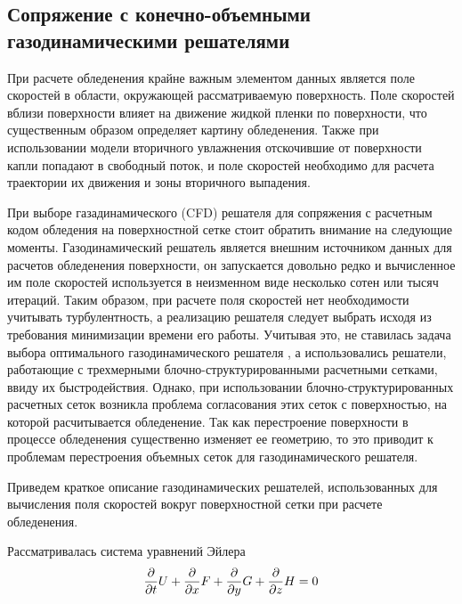 \subsection{Сопряжение с конечно-объемными \\ газодинамическими решателями}\label{sec:text_1_gas}

При расчете обледенения крайне важным элементом данных является поле скоростей в области, окружающей рассматриваемую поверхность.
Поле скоростей вблизи поверхности влияет на движение жидкой пленки по поверхности, что существенным образом определяет картину обледенения.
Также при использовании модели вторичного увлажнения отскочившие от поверхности капли попадают в свободный поток, и поле скоростей необходимо для расчета траектории их движения и зоны вторичного выпадения.

При выборе газадинамического (CFD\label{abbr:cfd}) решателя для сопряжения с расчетным кодом обледения на поверхностной сетке стоит обратить внимание на следующие моменты.
Газодинамический решатель является внешним источником данных для расчетов обледенения поверхности, он запускается довольно редко и вычисленное им поле скоростей используется в неизменном виде несколько сотен или тысяч итераций.
Таким образом, при расчете поля скоростей нет необходимости учитывать турбулентность, а реализацию решателя следует выбрать исходя из требования минимизации времени его работы.
Учитывая это, не ставилась задача выбора оптимального газодинамического решателя \cite{Blazek2015CFD}, а использовались решатели, работающие с трехмерными блочно-структурированными расчетными сетками, ввиду их быстродействия.
Однако, при использовании блочно-структурированных расчетных сеток возникла проблема согласования этих сеток с поверхностью, на которой расчитывается обледенение.
Так как перестроение поверхности в процессе обледенения существенно изменяет ее геометрию, то это приводит к проблемам перестроения объемных сеток для газодинамического решателя.

Приведем краткое описание газодинамических решателей, использованных для вычисления поля скоростей вокруг поверхностной сетки при расчете обледенения.

Рассматривалась система уравнений Эйлера \cite{Kulikovsky2001Gas}
\begin{equation}\label{eqn:text_1_gas_system}
	\frac{\partial}{\partial t} U + \frac{\partial}{\partial x} F + \frac{\partial}{\partial y} G + \frac{\partial}{\partial z} H = 0 \\
\end{equation}

